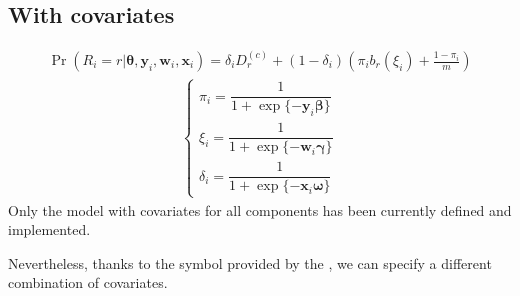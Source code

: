 \documentclass[letterpaper,10pt,english]{sphinxmanual}
\begin{document}
\subsection{With covariates}
\label{\detokenize{manual:id77}}\begin{equation*}
\begin{split}\Pr(R_i=r|\pmb\theta, \pmb y_i, \pmb w_i, \pmb x_i) = \delta_i D_r^{(c)} + (1-\delta_i)\left(\pi_i b_r(\xi_i) + \frac{1-\pi_i}{m} \right)\end{split}
\end{equation*}\begin{equation*}
\begin{split}\left\{
\begin{array}{l}
    \pi_i = \dfrac{1}{1+\exp\{-\pmb y_i \pmb \beta\}}
    \\
    \xi_i = \dfrac{1}{1+\exp\{-\pmb w_i \pmb \gamma\}}
    \\
    \delta_i = \dfrac{1}{1+\exp\{-\pmb x_i \pmb \omega\}}
\end{array}
\right.\end{split}
\end{equation*}
\sphinxAtStartPar
Only the model with covariates for all components has been
currently defined and implemented.

\sphinxAtStartPar
Nevertheless, thanks to the symbol  provided by the
, we can specify a different combination
of covariates.
\end{document}
